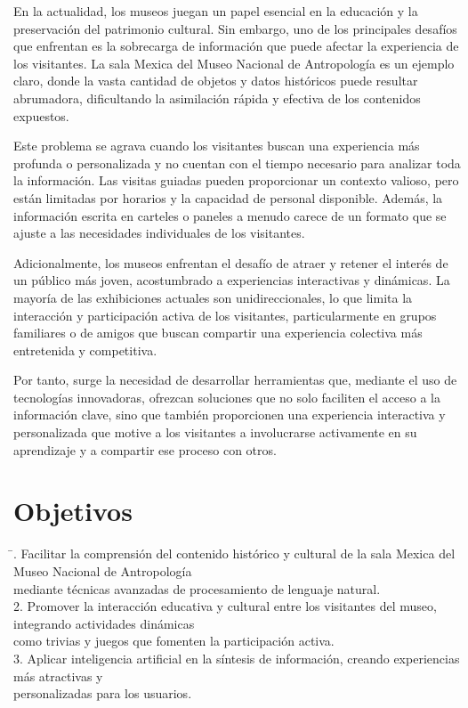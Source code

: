 \documentclass{report}
\begin{document}
        En la actualidad, los museos juegan un papel esencial en la educación y la preservación del patrimonio cultural. Sin embargo, uno de los principales desafíos que enfrentan es la sobrecarga de información que puede afectar la experiencia de los visitantes. La sala Mexica del Museo Nacional de Antropología es un ejemplo claro, donde la vasta cantidad de objetos y datos históricos puede resultar abrumadora, dificultando la asimilación rápida y efectiva de los contenidos expuestos.
    
        Este problema se agrava cuando los visitantes buscan una experiencia más profunda o personalizada y no cuentan con el tiempo necesario para analizar toda la información. Las visitas guiadas pueden proporcionar un contexto valioso, pero están limitadas por horarios y la capacidad de personal disponible. Además, la información escrita en carteles o paneles a menudo carece de un formato que se ajuste a las necesidades individuales de los visitantes.
    
        Adicionalmente, los museos enfrentan el desafío de atraer y retener el interés de un público más joven, acostumbrado a experiencias interactivas y dinámicas. La mayoría de las exhibiciones actuales son unidireccionales, lo que limita la interacción y participación activa de los visitantes, particularmente en grupos familiares o de amigos que buscan compartir una experiencia colectiva más entretenida y competitiva.

        Por tanto, surge la necesidad de desarrollar herramientas que, mediante el uso de tecnologías innovadoras, ofrezcan soluciones que no solo faciliten el acceso a la información clave, sino que también proporcionen una experiencia interactiva y personalizada que motive a los visitantes a involucrarse activamente en su aprendizaje y a compartir ese proceso con otros.
    
        
    \section{Objetivos}
    \begin{tabbing}
        \hspace{2cm} \= . Facilitar la comprensión del contenido histórico y cultural de la sala Mexica del Museo Nacional de Antropología\\
        mediante técnicas avanzadas de procesamiento de lenguaje natural. \\
        2. Promover la interacción educativa y cultural entre los visitantes del museo, integrando actividades dinámicas\\
           como trivias y juegos que fomenten la participación activa. \\
        3. Aplicar inteligencia artificial en la síntesis de información, creando experiencias más atractivas y\\
        personalizadas para los usuarios.
    \end{tabbing}
\end{document}
